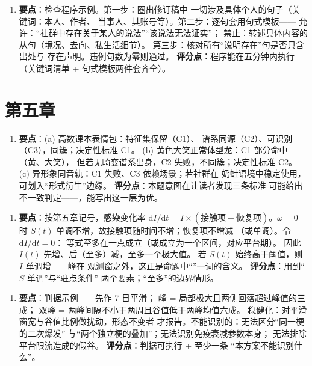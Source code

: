 \begin{enumerate}[label=\textbf{3.},leftmargin=2.6em]
  \item \textbf{要点}：检查程序示例。第一步：圈出修订稿中
        一切涉及具体个人的句子（关键词：本人、作者、
        当事人、其账号等）。第二步：逐句套用句式模板——
        允许：“社群中存在关于某人的说法”“该说法无法证实”；
        禁止：转述具体内容的从句（境况、去向、私生活细节）。
        第三步：核对所有“说明存在”句是否只含出处与
        存在声明。违例句数为零则通过。
        \textbf{评分点}：程序能在五分钟内执行
        （关键词清单 + 句式模板两件套齐全）。
\end{enumerate}

\section{第五章}\label{app:ans:05}

\begin{enumerate}[label=\textbf{1.},leftmargin=2.6em]
  \item \textbf{要点}：(a) 高数课本表情包：特征集保留（C1）、
        谱系同源（C2）、可识别（C3），同簇；决定性标准 C1。
        (b) 黄色大笑正常体型龙：C1 部分命中（黄、大笑），
        但若无畸变谱系出身，C2 失败，不同簇；决定性标准 C2。
        (c) 异形象同音轨：C1 失败、C3 依赖场景；若社群在
        奶蛙语境中稳定使用，可划入“形式衍生”边缘。
        \textbf{评分点}：本题意图在让读者发现三条标准
        可能给出不一致判定——，能写出这一层为优。
\end{enumerate}

\begin{enumerate}[label=\textbf{2.},leftmargin=2.6em]
  \item \textbf{要点}：按第五章记号，感染变化率
        $\mathrm{d}I/\mathrm{d}t = I \times
        (\text{接触项} - \text{恢复项})$。$\omega = 0$ 时
        $S(t)$ 单调不增，故接触项随时间不增；恢复项不增减
        （或单调）。令 $\mathrm{d}I/\mathrm{d}t = 0$：
        等式至多在一点成立（或成立为一个区间，对应平台期）。
        因此 $I(t)$ 先增、后（至多）减，至多一个极大值。
        若 $S(t)$ 始终高于阈值，则 $I$ 单调增——峰在
        观测窗之外，这正是命题中“”一词的含义。
        \textbf{评分点}：用到“$S$ 单调”与“驻点条件”
        两个要素；“至多”的边界情形。
\end{enumerate}

\begin{enumerate}[label=\textbf{3.},leftmargin=2.6em]
  \item \textbf{要点}：判据示例——先作 7 日平滑；
        峰 = 局部极大且两侧回落超过峰值的三成；
        双峰 = 两峰间隔不小于两周且谷值低于两峰均值六成。
        稳健化：对平滑窗宽与谷值比例做扰动，形态不变者
        才报告。不能识别的：无法区分“同一梗的二次爆发”
        与“两个独立梗的叠加”；无法识别免疫衰减参数本身；
        无法排除平台限流造成的假谷。
        \textbf{评分点}：判据可执行 + 至少一条
        “本方案不能识别什么”。
\end{enumerate}


